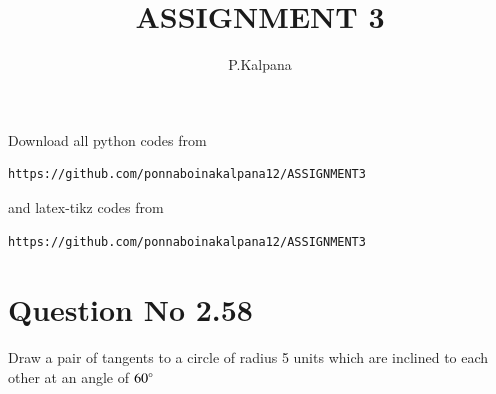 \documentclass[journal,12pt,twocolumn]{IEEEtran}
\begin{document}
     \def\rightbox#1{\makebox[0in][r]{#1}}
     \def\centbox#1{\makebox[0in]{#1}}
     \def\topbox#1{\raisebox{-\baselineskip}[0in][0in]{#1}}
     \def\midbox#1{\raisebox{-0.5\baselineskip}[0in][0in]{#1}}
\vspace{3cm}
\title{ASSIGNMENT 3}
\author{P.Kalpana}
\maketitle
\newpage
\bigskip
\renewcommand{\thefigure}{\theenumi}
\renewcommand{\thetable}{\theenumi}
Download all python codes from 
\begin{lstlisting}
https://github.com/ponnaboinakalpana12/ASSIGNMENT3
\end{lstlisting}
%
and latex-tikz codes from 
%
\begin{lstlisting}
https://github.com/ponnaboinakalpana12/ASSIGNMENT3
\end{lstlisting}
%
\section{Question No 2.58}
Draw a  pair of tangents to a circle of radius 5 units  which are inclined to each other at an angle of $60\degree$
%
\end{document}
